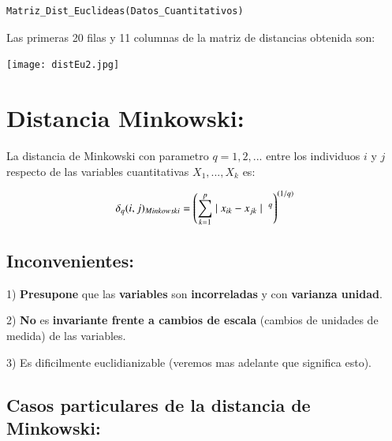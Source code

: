\documentclass[12pt]{report} %
\begin{document}
 

\begin{lstlisting}
Matriz_Dist_Euclideas(Datos_Cuantitativos)
\end{lstlisting}



Las primeras 20 filas y 11 columnas de la matriz de distancias obtenida son:

\texttt{[image: distEu2.jpg]}

\newpage


\section{Distancia Minkowski:}

\begin{tcolorbox}[toptitle=2mm,title= Distancia Minkowski:   ]

La distancia de Minkowski con parametro $q=1,2,...$ entre los individuos $i$ y $j$ respecto de las variables cuantitativas $X_1,...,X_k$ es:


\begin{gather*}
\delta_q(i,j)_{Minkowski } = \left( \sum_{k=1}^{p}  \mid x_{ik} - x_{jk} \mid \hspace{0.1cm} ^q  \right)^{(1/q)}    
\end{gather*}

\end{tcolorbox}

\vspace{0.2cm}

\subsection{Inconvenientes:}

1) \hspace{0.15cm} \textbf{Presupone} que las \textbf{variables} son \textbf{incorreladas} y con \textbf{varianza unidad}. 

2) \hspace{0.15cm} \textbf{No} es \textbf{invariante frente a cambios de escala} (cambios de unidades de medida) de las variables.

3)\hspace{0.15cm} Es dificilmente euclidianizable (veremos mas adelante que significa esto).


\subsection{Casos particulares de la distancia de Minkowski:}
\end{document}
